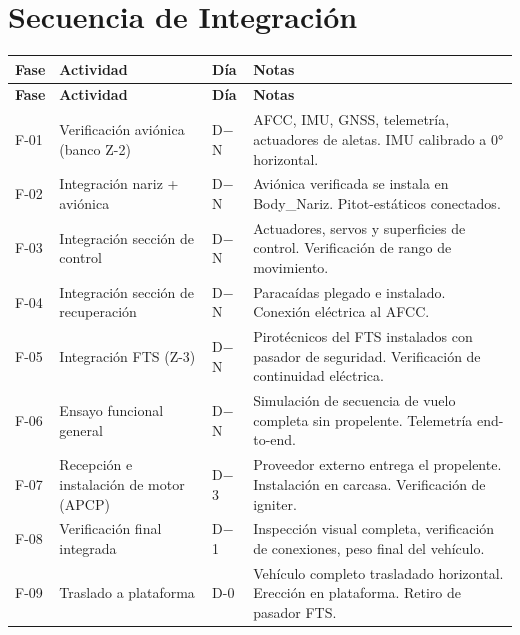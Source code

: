 \documentclass[11pt, a4paper]{article}
\begin{document}
\section{Secuencia de Integración}

\begin{longtable}{C{1.2cm} L{3.5cm} C{2cm} L{6.5cm}}
  \color{white}\textbf{Fase} &
  \color{white}\textbf{Actividad} &
  \color{white}\textbf{Día} &
  \color{white}\textbf{Notas} \\
  \endfirsthead
  \color{white}\textbf{Fase} &
  \color{white}\textbf{Actividad} &
  \color{white}\textbf{Día} &
  \color{white}\textbf{Notas} \\
  \endhead
  F-01 & Verificación aviónica (banco Z-2) & D$-$N & AFCC, IMU, GNSS, telemetría, actuadores de aletas. IMU calibrado a 0° horizontal. \\
  F-02 & Integración nariz + aviónica & D$-$N & Aviónica verificada se instala en Body\_Nariz. Pitot-estáticos conectados. \\
  F-03 & Integración sección de control & D$-$N & Actuadores, servos y superficies de control. Verificación de rango de movimiento. \\
  F-04 & Integración sección de recuperación & D$-$N & Paracaídas plegado e instalado. Conexión eléctrica al AFCC. \\
  F-05 & Integración FTS (Z-3) & D$-$N & Pirotécnicos del FTS instalados con pasador de seguridad. Verificación de continuidad eléctrica. \\
  F-06 & Ensayo funcional general & D$-$N & Simulación de secuencia de vuelo completa sin propelente. Telemetría end-to-end. \\
  F-07 & Recepción e instalación de motor (APCP) & D$-$3 & Proveedor externo entrega el propelente. Instalación en carcasa. Verificación de igniter. \\
  F-08 & Verificación final integrada & D$-$1 & Inspección visual completa, verificación de conexiones, peso final del vehículo. \\
  F-09 & Traslado a plataforma & D-0 & Vehículo completo trasladado horizontal. Erección en plataforma. Retiro de pasador FTS. \\
\end{longtable}

\end{document}
